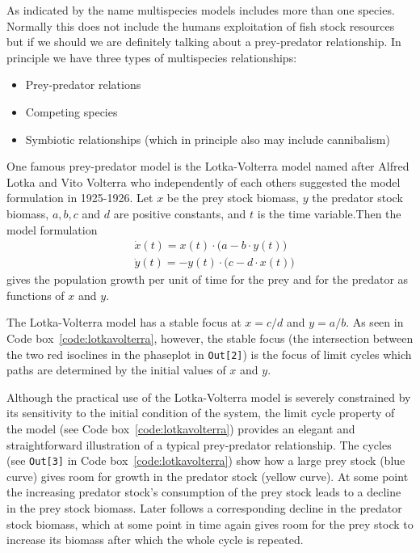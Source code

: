 \documentclass[11pt,fleqn]{book} %
\begin{document}
As indicated by the name multispecies models includes more than one species. Normally this does not include the humans exploitation of fish stock resources but if we should we are definitely talking about a prey-predator relationship. In principle we have three types of multispecies relationships:
\begin{itemize}
\item Prey-predator relations
\item Competing species
\item Symbiotic relationships (which in principle also may include cannibalism)
\end{itemize}
\hfill \break
{}One famous prey-predator model is the Lotka-Volterra model named after Alfred Lotka and Vito Volterra\cite{Volterra1938} who independently of each others suggested the model formulation in 1925-1926. Let $x$ be the prey stock biomass, $y$ the predator stock biomass, $a, b, c$ and $d$ are positive constants, and $t$ is the time variable.Then the model formulation
\begin{equation}
\label{eq:lotkavolterra}
\begin{aligned} & \dot{x}(t) = x(t) \cdot \Big(a - b \cdot y(t)\Big) \\
& \dot{y}(t) = - y(t) \cdot \Big(c - d \cdot x(t)\Big)
\end{aligned}
\end{equation}
gives the population growth per unit of time for the prey and for the predator as functions of $x$ and $y$.

The Lotka-Volterra model has a stable focus at $x = c/d$ and $y = a/b$. As seen in Code box~\ref{code:lotkavolterra}, however, the stable focus (the intersection between the two red isoclines in the phaseplot in \texttt{Out[2]}) is the focus of limit cycles which paths are determined by the initial values of $x$ and $y$.

Although the practical use of the Lotka-Volterra model is severely constrained by its sensitivity to the initial condition of the system, the limit cycle property of the model (see Code box~\ref{code:lotkavolterra}) provides an elegant and straightforward illustration of a typical prey-predator relationship. The cycles (see \texttt{Out[3]} in Code box~\ref{code:lotkavolterra}) show how a large prey stock (blue curve) gives room for growth in the predator stock (yellow curve). At some point the increasing predator stock's consumption of the prey stock leads to a decline in the prey stock biomass. Later follows a corresponding decline in the predator stock biomass, which \textendash \space at some point in time \textendash \space again gives room for the prey stock to increase its biomass after which the whole cycle is repeated.
\end{document}
